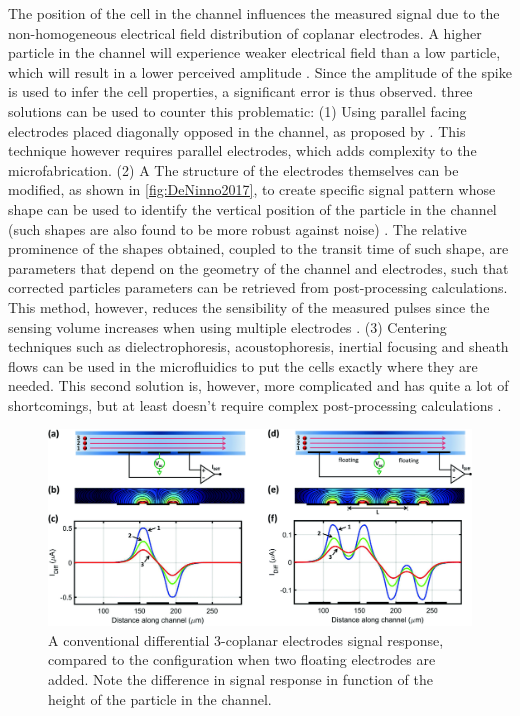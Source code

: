 The position of the cell in the channel influences the measured signal due to the non-homogeneous electrical field distribution of coplanar electrodes. A higher particle in the channel will experience weaker electrical field than a low particle, which will result in a lower perceived amplitude \cite{De_Ninno2017,caselli2018novel}. Since the amplitude of the spike is used to infer the cell properties, a significant error is thus observed. three solutions can be used to counter this problematic: (1) Using parallel facing electrodes placed diagonally opposed in the channel, as proposed by \citep{caselli2018novel}. This technique however requires parallel electrodes, which adds complexity to the microfabrication. (2) A The structure of the electrodes themselves can be modified, as shown in \autoref{fig:DeNinno2017}, to create specific signal pattern whose shape can be used to identify the vertical position of the particle in the channel (such shapes are also found to be more robust against noise)  \cite{Carminati2017,De_Ninno2017}. The relative prominence of the shapes obtained, coupled to the transit time of such shape, are parameters that depend on the geometry of the channel and electrodes, such that corrected particles parameters can be retrieved from post-processing calculations. This method, however, reduces the sensibility of the measured pulses since the sensing volume increases when using multiple electrodes \cite{petchakup2017advances}. (3) Centering techniques such as dielectrophoresis, acoustophoresis, inertial focusing and sheath flows can be used in the microfluidics to put the cells exactly where they are needed. This second solution is, however, more complicated and has quite a lot of shortcomings, but at least doesn’t require complex post-processing calculations \cite{De_Ninno2017}. \par
\begin{figure}[h]
    \centering
    \includegraphics[width=1\textwidth]{images/DeNinno2017.png}
    \caption{A conventional differential 3-coplanar electrodes signal response, compared to the configuration when two floating electrodes are added. Note the difference in signal response in function of the height of the particle in the channel.\citep{De_Ninno2017}}
    \label{fig:DeNinno2017}
\end{figure}

